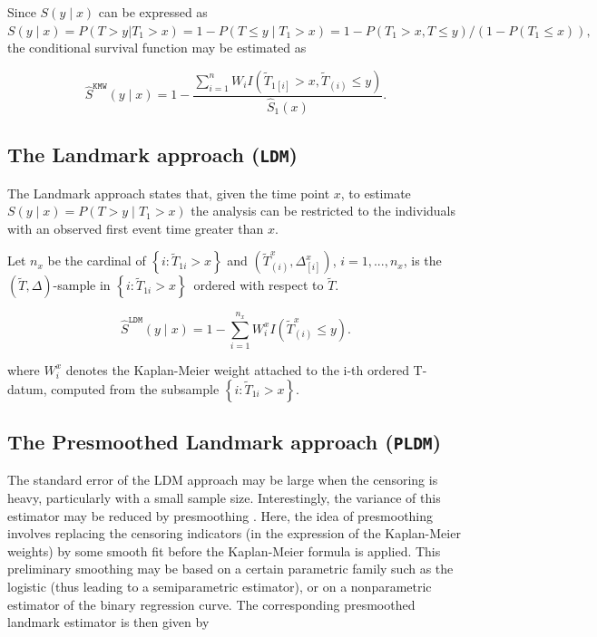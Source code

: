 \documentclass[]{book}
\theoremstyle{definition}
\theoremstyle{definition}
\theoremstyle{definition}
\theoremstyle{remark}
\begin{document}
Since \(S(y\mid x)\) can be expressed as
\(S(y\mid x)=P(T > y|T_1 > x) = 1 - P(T\leq y\mid T_1 > x)= 1 - P(T_1 > x, T\leq y)/\left(1-P\left(T_1\leq x\right)\right),\)
the conditional survival function may be estimated as

\begin{equation}
\widehat S^{\texttt{KMW}}(y\mid x)=1-\frac{\sum_{i=1}^{n}{W_iI(\widetilde T_{1\left[i\right]} >x, \widetilde T_{\left(i\right)} \leq y)}}{\widehat S_1(x)}.
\end{equation}

\subsection{\texorpdfstring{The Landmark approach
(\texttt{LDM})}{The Landmark approach (LDM)}}\label{the-landmark-approach-ldm}

The Landmark approach \citep{vanHouwelingen} states that, given the time
point \(x\), to estimate \(S(y\mid x)=P(T> y\mid T_1>x)\) the analysis
can be restricted to the individuals with an observed first event time
greater than \(x\).

Let \(n_x\) be the cardinal of \(\left\{i:\widetilde T_{1i}>x\right\}\)
and
\(\left( \widetilde T_{\left( i\right) }^{x},\Delta_{\left[ i\right]}^{x}\right)\),
\(i=1,...,n_{x}\), is the \(\left(\widetilde T,\Delta\right)\)-sample in
\(\left\{i:\widetilde T_{1i}>x\right\}\)~ordered with respect to
\(\widetilde T\).

\begin{equation*}
\widehat S^{\texttt{LDM}}(y\mid x)=1-\sum_{i=1}^{n_x}{W_i^{x}I(\widetilde T_{\left(i\right)}^x \leq y)}.
\end{equation*}

\noindent where \(W_i^{x}\) denotes the Kaplan-Meier weight attached to
the i-th ordered T-datum, computed from the subsample
\(\left\{i:\widetilde T_{1i}>x\right\}\).

\subsection{\texorpdfstring{The Presmoothed Landmark approach
(\texttt{PLDM})}{The Presmoothed Landmark approach (PLDM)}}\label{the-presmoothed-landmark-approach-pldm}

The standard error of the LDM approach may be large when the censoring
is heavy, particularly with a small sample size. Interestingly, the
variance of this estimator may be reduced by presmoothing
\citep{Dikta1998}. Here, the idea of presmoothing involves replacing the
censoring indicators (in the expression of the Kaplan-Meier weights) by
some smooth fit before the Kaplan-Meier formula is applied. This
preliminary smoothing may be based on a certain parametric family such
as the logistic (thus leading to a semiparametric estimator), or on a
nonparametric estimator of the binary regression curve. The
corresponding presmoothed landmark estimator is then given by
\end{document}
